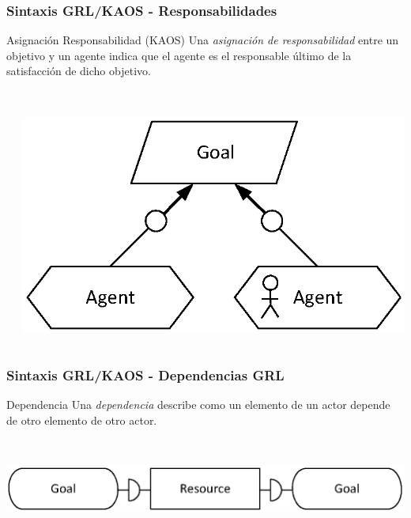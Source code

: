 \documentclass[slidestop,xcolor=pst,dvips,blue]{beamer}
\begin{document}
\begin{frame}[c]
    \frametitle{Sintaxis GRL/KAOS - Responsabilidades}
    \begin{block}{Asignación Responsabilidad (KAOS)}
        Una \alert{\emph{asignación de responsabilidad}} entre un objetivo y un agente indica que el agente es el responsable último de la satisfacción de dicho objetivo.
        \ \\
        \ \\
        \begin{columns}[c]
            \begin{column}{0.50\linewidth}
            \end{column}
            \begin{column}{0.50\linewidth}
                \centering \includegraphics[width=0.65\columnwidth,keepaspectratio=true]{images/objetivos/responsabilityAsig(KAOS).eps}
            \end{column}
        \end{columns}
    \end{block}
\end{frame}

\begin{frame}[t]
    \frametitle{Sintaxis GRL/KAOS - Dependencias GRL}
    \begin{block}{Dependencia}
        Una \alert{\emph{dependencia}} describe como un elemento de un actor depende de otro  elemento de otro actor.
        \ \\
        \ \\
        \begin{columns}
            \begin{column}{\linewidth}
                \centering \includegraphics[width=0.75\columnwidth,keepaspectratio=true]{images/objetivos/dependency(GRL).eps}
            \end{column}
        \end{columns}
    \end{block}
\end{frame}
\end{document}
